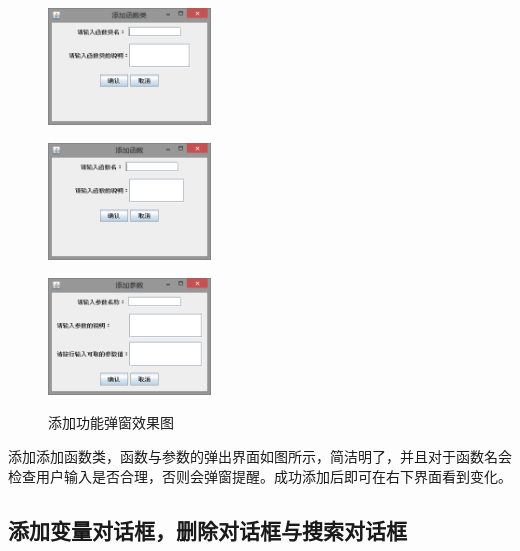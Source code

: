 \documentclass[hyperref, UTF8
,bookmarksnumbered=true, oneside]{ctexbook}
\begin{document}
			\begin{figure}[!h]
				\begin{minipage}[b]{0.3\textwidth}
				\centering
				\includegraphics[width=1.7in]{AddFuncClass.png}
				\label{pic:MathPack}
				\end{minipage}%
				\hspace{0.025\textwidth}%
				\begin{minipage}[b]{0.3\textwidth}
				\centering
				\includegraphics[width=1.7in]{AddMathFunc.png}
				\label{pic:GUIPack}
				\end{minipage}			
				\hspace{0.025\textwidth}%
				\begin{minipage}[b]{0.3\textwidth}
				\centering
				\includegraphics[width=1.7in]{AddPara.png}
				\label{pic:GUIPack}
				\end{minipage}
				\caption{添加功能弹窗效果图}
			\end{figure}

			添加添加函数类，函数与参数的弹出界面如图所示，简洁明了，并且对于函数名会检查用户输入是否合理，否则会弹窗提醒。成功添加后即可在右下界面看到变化。



		\subsection{添加变量对话框，删除对话框与搜索对话框} %
\end{document}
